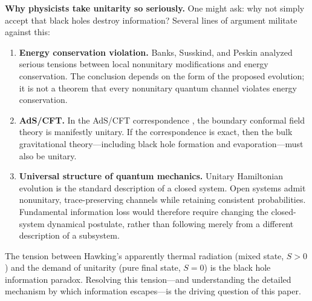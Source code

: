\documentclass[11pt,letterpaper]{article}
\theoremstyle{plain}
\theoremstyle{definition}
\theoremstyle{remark}
\begin{document}
\medskip
\noindent\textbf{Why physicists take unitarity so seriously.}
One might ask: why not simply accept that black holes destroy information?
Several lines of argument militate against this:

\begin{enumerate}[label=(\alph*),itemsep=2pt]
\item \textbf{Energy conservation violation.}  Banks, Susskind, and Peskin
\cite{banks1984} analyzed serious tensions between local nonunitary modifications and
energy conservation. The conclusion depends on the form of the proposed
evolution; it is not a theorem that every nonunitary quantum channel violates
energy conservation.

\item \textbf{AdS/CFT.}  In the AdS/CFT correspondence \cite{maldacena1998}, the
boundary conformal field theory is manifestly unitary.  If the correspondence is
exact, then the bulk gravitational theory---including black hole formation and
evaporation---must also be unitary.

\item \textbf{Universal structure of quantum mechanics.}  Unitary Hamiltonian evolution is the standard description of a closed
system. Open systems admit nonunitary, trace-preserving channels while
retaining consistent probabilities. Fundamental information loss would
therefore require changing the closed-system dynamical postulate, rather
than following merely from a different description of a subsystem.
\end{enumerate}

The tension between Hawking's apparently thermal radiation (mixed state, $S>0$) and
the demand of unitarity (pure final state, $S=0$) is the black hole information
paradox.  Resolving this tension---and understanding the detailed mechanism by which
information escapes---is the driving question of this paper.
\end{document}
